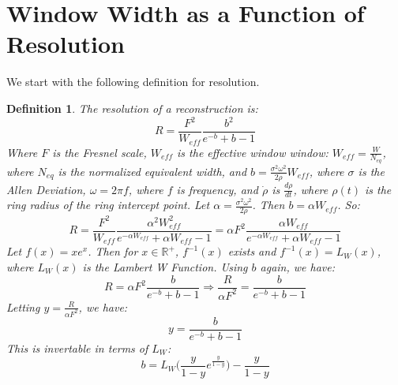 \documentclass{article}
\theoremstyle{mystyle}
\newtheorem{definition}{Definition}[section]
\begin{document}
\section{Window Width as a Function of Resolution}
We start with the following definition for resolution.
\begin{definition}
The resolution of a reconstruction is:
\begin{equation*}
    R = \frac{F^2}{W_{eff}}\frac{b^2}{e^{-b}+b-1}
\end{equation*}
Where $F$ is the Fresnel scale, $W_{eff}$ is the effective window window: $W_{eff} = \frac{W}{N_{eq}}$, where $N_{eq}$ is the normalized equivalent width, and $b = \frac{\sigma^2 \omega^2}{2\dot{\rho}}W_{eff}$, where $\sigma$ is the Allen Deviation, $\omega = 2\pi f$, where $f$ is frequency, and $\dot{\rho}$ is $\frac{d\rho}{dt}$, where $\rho(t)$ is the ring radius of the ring intercept point. Let $\alpha = \frac{\sigma^2 \omega^2}{2\dot{\rho}}$. Then $b = \alpha W_{eff}$. So:
\begin{equation*}
R = \frac{F^2}{W_{eff}}\frac{\alpha^2 W_{eff}^2}{e^{-\alpha W_{eff}}+\alpha W_{eff}-1} = \alpha F^2 \frac{\alpha W_{eff}}{e^{-\alpha W_{eff}}+\alpha W_{eff} - 1}
\end{equation*}
Let $f(x) = xe^{x}$. Then for $x\in \mathbb{R}^{+}$, $f^{-1}(x)$ exists and $f^{-1}(x) = L_{W}(x)$, where $L_{W}(x)$ is the Lambert W Function. Using $b$ again, we have:
\begin{equation*}
    R = \alpha F^2 \frac{b}{e^{-b}+b-1}\Rightarrow \frac{R}{\alpha F^2} = \frac{b}{e^{-b}+b-1}
\end{equation*}
Letting $y = \frac{R}{\alpha F^2}$, we have:
\begin{equation*}
    y = \frac{b}{e^{-b}+b-1}
\end{equation*}
This is invertable in terms of $L_{W}$:
\begin{equation*}
    b = L_{W}\bigg(\frac{y}{1-y}e^{\frac{y}{1-y}}\bigg) - \frac{y}{1-y}
\end{equation*}
\end{definition}
\clearpage
\setlength\LTleft{0pt}
\setlength\LTright{0pt}
\setlength\glsdescwidth{0.8198\hsize}
\printglossary[type=\acronymtype, style=long]
\clearpage
{}
\printglossary[style = clong]
\end{document}
